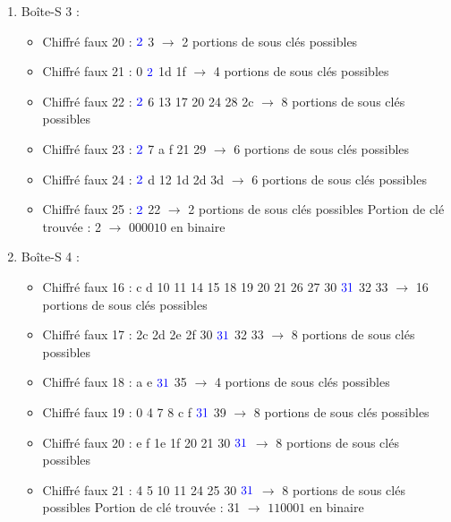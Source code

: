 \documentclass[11pt]{article}
\begin{document}
\begin{enumerate}
\item Boîte-S 3 : 
\begin{itemize}
	\item Chiffré faux 20 : $\color{blue}2$ 3 $\longrightarrow$ 2 portions de sous clés possibles
	\item Chiffré faux 21 : 0 $\color{blue}2$ 1d 1f $\longrightarrow$ 4 portions de sous clés possibles
	\item Chiffré faux 22 : $\color{blue}2$ 6 13 17 20 24 28 2c $\longrightarrow$ 8 portions de sous clés possibles
	\item Chiffré faux 23 : $\color{blue}2$ 7 a f 21 29 $\longrightarrow$ 6 portions de sous clés possibles
	\item Chiffré faux 24 : $\color{blue}2$ d 12 1d 2d 3d $\longrightarrow$ 6 portions de sous clés possibles
	\item Chiffré faux 25 : $\color{blue}2$ 22 $\longrightarrow$ 2 portions de sous clés possibles \newline
	Portion de clé trouvée : 2 $\longrightarrow$ $000010$ en binaire
\end{itemize}\newpage

\item Boîte-S 4 : 
\begin{itemize}
	\item Chiffré faux 16 : c d 10 11 14 15 18 19 20 21 26 27 30 $\color{blue}31$ 32 33 $\longrightarrow$ 16 portions de sous clés possibles
	\item Chiffré faux 17 : 2c 2d 2e 2f 30 $\color{blue}31$ 32 33 $\longrightarrow$ 8 portions de sous clés possibles
	\item Chiffré faux 18 : a e $\color{blue}31$ 35 $\longrightarrow$ 4 portions de sous clés possibles
	\item Chiffré faux 19 : 0 4 7 8 c f $\color{blue}31$ 39 $\longrightarrow$ 8 portions de sous clés possibles
	\item Chiffré faux 20 : e f 1e 1f 20 21 30 $\color{blue}31$ $\longrightarrow$ 8 portions de sous clés possibles
	\item Chiffré faux 21 : 4 5 10 11 24 25 30 $\color{blue}31$ $\longrightarrow$ 8 portions de sous clés possibles \newline
	Portion de clé trouvée : 31 $\longrightarrow$ $110001$ en binaire
\end{itemize}


\end{enumerate}
\end{document}
